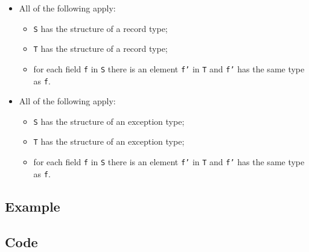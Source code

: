\documentclass{book}
\begin{document}
\begin{itemize}
  \item All of the following apply:
    \begin{itemize}
    \item \texttt{S} has the structure of a record type;
    \item \texttt{T} has the structure of a record type;
    \item for each field \texttt{f} in \texttt{S} there is an element \texttt{f'} in \texttt{T} and \texttt{f'} has
      the same type as \texttt{f}.
    \end{itemize}

  \item All of the following apply:
    \begin{itemize}
    \item \texttt{S} has the structure of an exception type;
    \item \texttt{T} has the structure of an exception type;
    \item for each field \texttt{f} in \texttt{S} there is an element \texttt{f'} in \texttt{T} and \texttt{f'} has
      the same type as \texttt{f}.
    \end{itemize}
  \end{itemize}

  \subsection{Example}

  \subsection{Code}
\begin{comment}
ROMAN: Why does the code use anonimization instead of getting the structure of types?
\end{comment}

\end{document}
